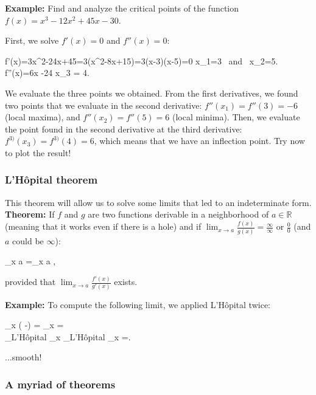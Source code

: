 {\bf Example:} Find and analyze the critical points of the function$f(x)=x^3-12x^2+45x-30$.

First, we solve $f'(x)=0$ and $f''(x)=0$:

\bnn
f'(x)=3x^2-24x+45=3(x^2-8x+15)=3(x-3)(x-5)=0 \quad \rightarrow x_1=3 \mbox{ and } x_2=5.\\
f''(x)=6x -24 \quad \rightarrow x_3 = 4.
\enn

We evaluate the three points we obtained. From the first derivatives, we found
two points that we evaluate in the second derivative: $f''(x_1)=f''(3)=-6$ (local maxima), and $f''(x_2)=f''(5)=6$ (local minima). Then, we evaluate the point
found in the second derivative at the third derivative: $f^{3)}(x_3)=f^{3)}(4)=6$, which means that we have an inflection point. Try now to plot the result!

\subsubsection{L'H{\^o}pital theorem}

This theorem will allow us to solve some limits that led to an indeterminate form. 
{\bf Theorem:} If $f$ and $g$ are two functions derivable in a neighborhood of $a\in \mathbb{R}$ (meaning that it works even if there is a hole) and if $\lim_{x  \rightarrow a} \frac{f(x)}{g(x)}=\frac{\infty}{\infty} \mbox{ or }\frac{0}{0}$ (and $a$ could be $\infty$):

\bnn
	\lim_{x \rightarrow a} =\lim_{x \rigightarrow a} ,
\enn

provided that $\lim_{x \rightarrow a} \frac{f'(x)}{g'(x)}$ exists.

{\bf Example:} To compute the following limit, we applied L'H{\^o}pital twice:

\bnn
 \lim_{x }\left(  -\right) =  \lim_{x }  = \\
\underbrace{=}_{\mbox{{\tiny L'H{\^o}pital}}} \lim_{x }\underbrace{=}_{\mbox{{\tiny L'H{\^o}pital}}} \lim_{x }=.
\enn

...smooth!
  
\subsubsection{A myriad of theorems}

